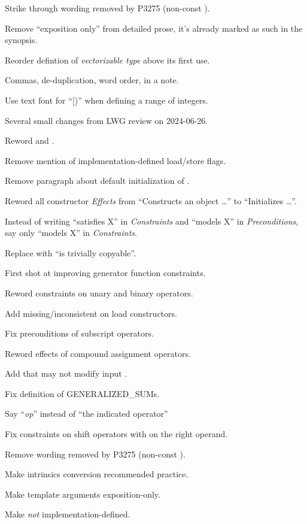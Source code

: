 \begin{revision}
\item Strike through wording removed by P3275 (non-const ).
\item Remove “exposition only” from detailed prose, it's already marked as such in the synopsis.
\item Reorder defintion of \emph{vectorizable type} above its first use.
\item Commas, de-duplication, word order,  in a note.
\item Use text font for “[)” when defining a range of integers.
\item Several small changes from LWG review on 2024-06-26.
\item Reword  and .
\item Remove mention of implementation-defined load/store flags.
\item Remove paragraph about default initialization of \simd.
\item Reword all constructor \emph{Effects} from “Constructs an object \ldots”
  to “Initializes \ldots”.
\item Instead of writing “satisfies X” in \emph{Constraints} and “models X” in
  \emph{Preconditions}, say only “models X” in \emph{Constraints}.
\item Replace  with “is trivially copyable”.
\item First shot at improving generator function constraints.
\item Reword constraints on unary and binary operators.
\item Add missing/inconsistent  on load constructors.
\item Fix preconditions of subscript operators.
\item Reword effects of compound assignment operators.
\item Add that  may not modify input \simd.
\item Fix definition of GENERALIZED_SUMs.
\end{revision}

\begin{revision}
\item Say “\textit{op}” instead of “the indicated operator”
\item Fix constraints on shift operators with \simdsizetype{} on the right operand.
\item Remove wording removed by P3275 (non-const ).
\item Make intrinsics conversion recommended practice.
\item Make  template arguments exposition-only.
\item Make  \emph{not} implementation-defined.

\end{revision}

